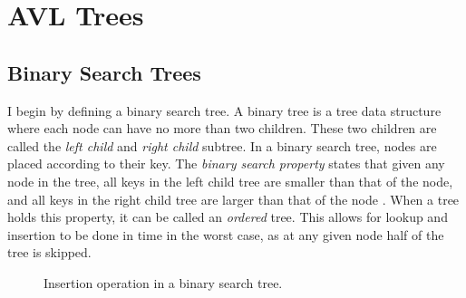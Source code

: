 \section{AVL Trees}

\subsection{Binary Search Trees} 
I begin by defining a binary search tree. A binary tree is a tree data structure where each node can have no more than two children. These two children are 
called the \textit{left child} and \textit{right child} subtree. In a binary search tree, nodes are placed according to their key. The 
\textit{binary search property} states that given any node in the tree, all keys in the left child tree are smaller than that of the node, and all keys in the 
right child tree are larger than that of the node . When a tree holds this property, it can be called an \textit{ordered} tree. 
This allows for lookup and insertion to be done in  time in the worst case, as at any given node half of the tree is skipped.

\begin{figure}[!h]
  \centering
  \begin{subfigure}{.3\textwidth}
    \centering
    \caption{}
    \label{fig:insert_1}
  \end{subfigure}%
  \begin{subfigure}{.3\textwidth}
    \centering
    \caption{}
    \label{fig:insert_2}
  \end{subfigure}%
  \begin{subfigure}{.3\textwidth}
    \centering
    \caption{}
    \label{fig:insert_3}
  \end{subfigure}
  \caption{Insertion operation in a binary search tree.}
  \label{fig:insert_demo}
\end{figure}

